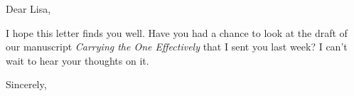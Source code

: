 \opening{Dear Lisa,}

I hope this letter finds you well.
Have you had a chance to look at the draft of our manuscript \emph{Carrying the One Effectively} that I sent you last week?
I can't wait to hear your thoughts on it.

\closing{Sincerely,}
